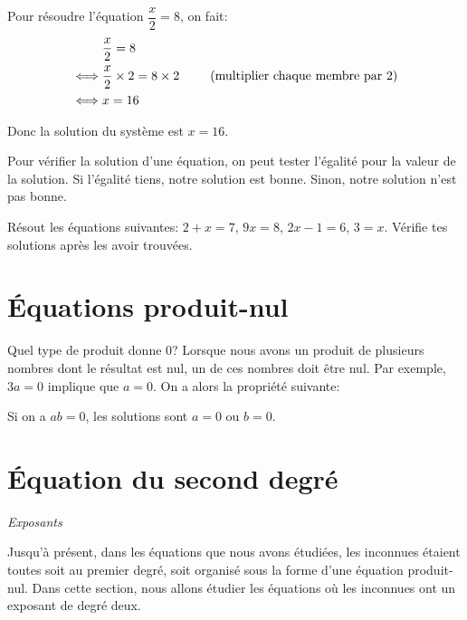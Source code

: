 \begin{exemple}
    Pour résoudre l'équation $\dfrac{x}{2} = 8$, on fait:
    \begin{alignat*}{3}
        & \dfrac{x}{2} = 8&\\
        \iff & \dfrac{x}{2} \times 2 = 8 \times 2& \hspace{5mm} \text{(multiplier chaque membre par 2)}\\
        \iff & x = 16&
    \end{alignat*}

    Donc la solution du système est $x = 16$.
\end{exemple}

\begin{astuce}
    Pour vérifier la solution d'une équation, on peut tester l'égalité pour la valeur de la solution. Si l'égalité tiens, notre solution est bonne. Sinon, notre solution n'est pas bonne.
\end{astuce}

\begin{exercice}
    Résout les équations suivantes: $2 + x = 7$, $9x = 8$, $2x - 1 = 6$, $3 = x$. Vérifie tes solutions après les avoir trouvées.
\end{exercice}


\section{Équations produit-nul}

Quel type de produit donne 0? Lorsque nous avons un produit de plusieurs nombres dont le résultat est nul, un de ces nombres doit être nul. Par exemple, $3a = 0$ implique que $a=0$. On a alors la propriété suivante:

\begin{propriete}
    Si on a $ab = 0$, les solutions sont $a = 0$ ou $b = 0$.
\end{propriete}

\section{Équation du second degré}

\begin{prerequis}
    \textit{Exposants}
\end{prerequis}

Jusqu'à présent, dans les équations que nous avons étudiées, les inconnues étaient toutes soit au premier degré, soit organisé sous la forme d'une équation produit-nul. Dans cette section, nous allons étudier les équations où les inconnues ont un exposant de degré deux.

